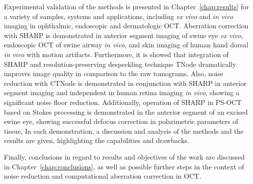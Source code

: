 Experimental validation of the methods is presented in Chapter~\ref{chap:results} for a variety of samples, systems and applications, including \textit{ex vivo} and \textit{in vivo} imaging in ophthalmic, endoscopic and dermatologic OCT. Aberration correction with SHARP is demonstrated in anterior segment imaging of swine eye \textit{ex vivo}, endoscopic OCT of swine airway \textit{in vivo}, and skin imaging of human hand dorsal \textit{in vivo} with motion artifacts. Furthermore, it is showed that integration of SHARP and resolution-preserving despeckling technique TNode dramatically improves image quality in comparison to the raw tomograms. Also, noise reduction with CTNode is demonstrated in conjunction with SHARP in anterior segment imaging and independent in human retina imaging \textit{in vivo}, showing a significant noise floor reduction. Additionally, operation of SHARP in PS-OCT based on Stokes processing is demonstrated in the anterior segment of an excised swine eye, showing successful defocus correction in polarimetric parameters of tissue, In each demonstration, a discussion and analysis of the methods and the results are given, highlighting the capabilities and drawbacks.

Finally, conclusions in regard to results and objectives of the work are discussed in Chapter~\ref{chap:conclusions}, as well as possible further steps in the context of noise reduction and computational aberration correction in OCT.